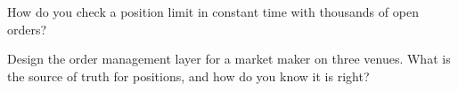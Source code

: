 \begin{interviewq}\label{iq:ll:order-gateway-and-order-management:5}
How do you check a position limit in constant time with thousands of open orders?
\end{interviewq}

\begin{interviewq}\label{iq:ll:order-gateway-and-order-management:6}
Design the order management layer for a market maker on three venues. What is the source of truth for positions, and how do
you know it is right?
\end{interviewq}
